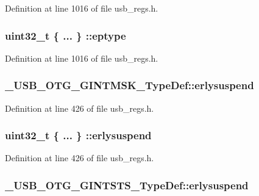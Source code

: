 Definition at line 1016 of file usb\-\_\-regs.\-h.

\hypertarget{group___u_s_b___o_t_g___d_r_i_v_e_r_gad11e4746a3b3f8d129ac9dfde2f74441}{
\subsubsection[{eptype}]{\setlength{\rightskip}{0pt plus 5cm}uint32\-\_\-t \{ ... \} \-::eptype}}\label{group___u_s_b___o_t_g___d_r_i_v_e_r_gad11e4746a3b3f8d129ac9dfde2f74441}


Definition at line 1016 of file usb\-\_\-regs.\-h.

\hypertarget{group___u_s_b___o_t_g___d_r_i_v_e_r_ga3ff2cc12f2439bd3361c5edb414c07b1}{
\subsubsection[{erlysuspend}]{ \-\_\-\-U\-S\-B\-\_\-\-O\-T\-G\-\_\-\-G\-I\-N\-T\-M\-S\-K\-\_\-\-Type\-Def\-::erlysuspend}}\label{group___u_s_b___o_t_g___d_r_i_v_e_r_ga3ff2cc12f2439bd3361c5edb414c07b1}


Definition at line 426 of file usb\-\_\-regs.\-h.

\hypertarget{group___u_s_b___o_t_g___d_r_i_v_e_r_ga37b6eec66d4474407702b560db57b3cf}{
\subsubsection[{erlysuspend}]{\setlength{\rightskip}{0pt plus 5cm}uint32\-\_\-t \{ ... \} \-::erlysuspend}}\label{group___u_s_b___o_t_g___d_r_i_v_e_r_ga37b6eec66d4474407702b560db57b3cf}


Definition at line 426 of file usb\-\_\-regs.\-h.

\hypertarget{group___u_s_b___o_t_g___d_r_i_v_e_r_gaa2d6edb7543a04dc301dfe99d40fdaa0}{
\subsubsection[{erlysuspend}]{ \-\_\-\-U\-S\-B\-\_\-\-O\-T\-G\-\_\-\-G\-I\-N\-T\-S\-T\-S\-\_\-\-Type\-Def\-::erlysuspend}}\label{group___u_s_b___o_t_g___d_r_i_v_e_r_gaa2d6edb7543a04dc301dfe99d40fdaa0}


